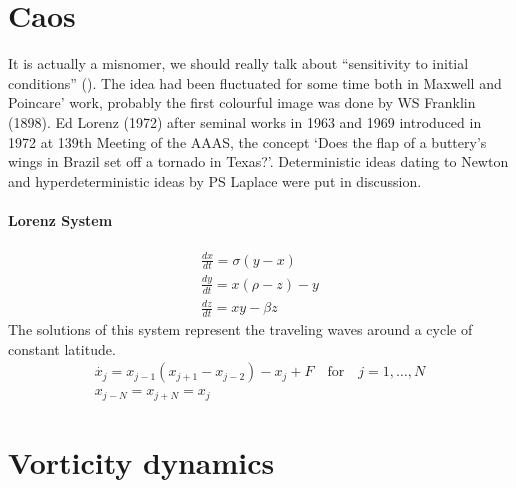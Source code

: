 \section{Caos}
It is actually a misnomer, we should really talk about “sensitivity to initial conditions” (\cite{Tanner2020}).
The idea had been fluctuated for some time both in Maxwell and Poincare’ work, probably the first colourful image was done by WS Franklin (1898). Ed Lorenz (1972) after seminal works in 1963 and 1969 introduced in 1972 at 139th Meeting of the AAAS, the concept ‘Does the flap of a buttery’s wings in Brazil set off a tornado in Texas?’. 
Deterministic ideas dating to Newton and hyperdeterministic ideas by PS Laplace were put in discussion.
\paragraph{Lorenz System}
\begin{align}\label{eq.lorenz system}
    \frac{dx}{dt}=\sigma(y-x)\\
    \frac{dy}{dt}=x(\rho-z)-y\\
    \frac{dz}{dt}=xy-\beta z
\end{align}
The solutions of this system represent the traveling waves around a cycle of constant latitude. 
\begin{align*}
    \dot{x_j}=x_{j-1}(x_{j+1}-x_{j-2})-x_j+F \quad \text{for} \quad j=1,\dots,N\\
    x_{j-N}=x_{j+N}=x_j
\end{align*}
\section{Vorticity dynamics}
